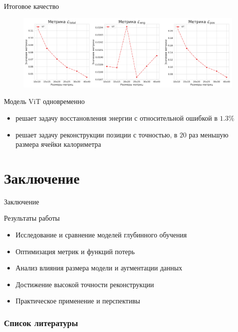 \documentclass[9pt]{beamer}
\begin{document}
\begin{frame}{Итоговое качество}
    \begin{figure}
        \centering
        \includegraphics[width=1.0\textwidth]{../report/graphics/best_vit.png}
    \end{figure}

    \begin{block}{Модель ViT одновременно}
        \begin{itemize}
            \item решает задачу восстановления энергии с относительной ошибкой в $1.3\%$
            \item решает задачу реконструкции позиции с точностью, в $20$ раз меньшую размера ячейки калориметра
        \end{itemize}
    \end{block}
\end{frame}

\section{Заключение}

\begin{frame}{Заключение}
    \begin{block}{Результаты работы}
        \begin{itemize}
            \item Исследование и сравнение моделей глубинного обучения
            \item Оптимизация метрик и функций потерь
            \item Анализ влияния размера модели и аугментации данных
            \item Достижение высокой точности реконструкции
            \item Практическое применение и перспективы
        \end{itemize}
    \end{block}
\end{frame}

\begin{frame}[allowframebreaks]
    \frametitle{Список литературы}
    \printbibliography
\end{frame}
\end{document}
